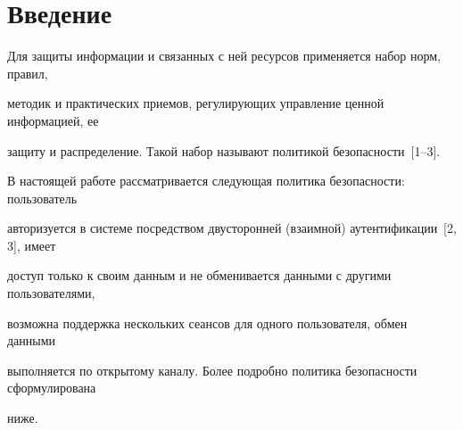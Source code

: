     















      \thispagestyle{headings}





      


            \label{st\stat}


            


            \vspace*{-12pt}





\section{Введение}





    Для защиты информации и связанных с ней ресурсов применяется набор норм, правил, 


методик и практических приемов, регулирующих управление ценной информацией, ее 


защиту и распределение. Такой набор называют политикой безопасности~[1--3].


    


    В настоящей работе рассматривается следующая политика безопасности: пользователь 


авторизуется в системе посредством двусторонней (взаимной) аутентификации~[2, 3], имеет 


доступ только к своим данным  и не обменивается данными с другими пользователями, 


возможна поддержка нескольких сеансов для одного пользователя, обмен данными 


выполняется по открытому каналу. Более подробно политика безопасности сформулирована 


ниже.


